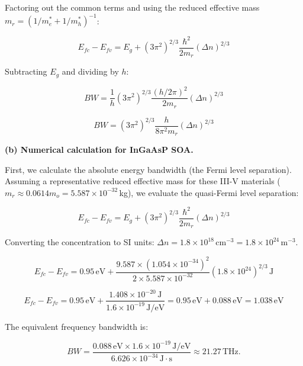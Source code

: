 Factoring out the common terms and using the reduced effective mass $m_r = (1/m_e^* + 1/m_h^*)^{-1}$:

\begin{equation*}
  E_{fc} - E_{fv} = E_g + (3\pi^2)^{2/3} \frac{\hbar^2}{2 m_r} (\Delta n)^{2/3}
\end{equation*}

Subtracting $E_g$ and dividing by $h$:

\begin{equation*}
  BW = \frac{1}{h} (3\pi^2)^{2/3} \frac{(h/2\pi)^2}{2 m_r} (\Delta n)^{2/3}
\end{equation*}

\begin{equation*}
  \boxed{BW = (3\pi^2)^{2/3} \frac{h}{8\pi^2 m_r} (\Delta n)^{2/3}}
\end{equation*}

\textbf{(b) Numerical calculation for InGaAsP SOA.}

First, we calculate the absolute energy bandwidth (the Fermi level separation). Assuming a representative reduced effective mass for these III-V materials ($m_r \approx 0.0614 m_o = 5.587 \times 10^{-32}$\,kg), we evaluate the quasi-Fermi level separation:

\begin{equation*}
  E_{fc} - E_{fv} = E_g + (3\pi^2)^{2/3} \frac{\hbar^2}{2 m_r} (\Delta n)^{2/3}
\end{equation*}

Converting the concentration to SI units: $\Delta n = 1.8 \times 10^{18}\,\text{cm}^{-3} = 1.8 \times 10^{24}\,\text{m}^{-3}$.

\begin{equation*}
  E_{fc} - E_{fv} = 0.95\,\text{eV} + \frac{9.587 \times (1.054 \times 10^{-34})^2}{2 \times 5.587 \times 10^{-32}} (1.8 \times 10^{24})^{2/3}\,\text{J}
\end{equation*}

\begin{equation*}
  E_{fc} - E_{fv} = 0.95\,\text{eV} + \frac{1.408 \times 10^{-20}\,\text{J}}{1.6 \times 10^{-19}\,\text{J/eV}} = 0.95\,\text{eV} + 0.088\,\text{eV} = 1.038\,\text{eV}
\end{equation*}

The equivalent frequency bandwidth is:

\begin{equation*}
  \boxed{BW = \frac{0.088\,\text{eV} \times 1.6 \times 10^{-19}\,\text{J/eV}}{6.626 \times 10^{-34}\,\text{J}\cdot\text{s}} \approx 21.27\,\text{THz}.}
\end{equation*}

